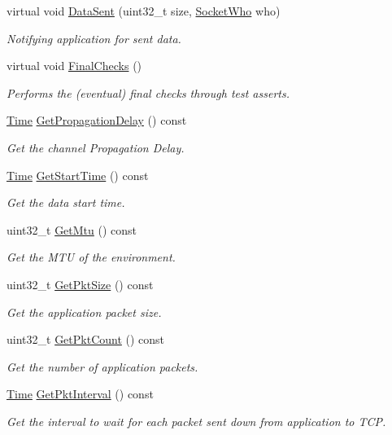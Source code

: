 \begin{DoxyCompactItemize}
virtual void \hyperlink{classns3_1_1TcpGeneralTest_a1de8ef221eeee5c045c91fe8fe8f3843}{Data\+Sent} (uint32\+\_\+t size, \hyperlink{classns3_1_1TcpGeneralTest_a29338e6b7137cad650c2ff835713f6ee}{Socket\+Who} who)
\begin{DoxyCompactList}\small\item\em Notifying application for sent data. \end{DoxyCompactList}\item 
virtual void \hyperlink{classns3_1_1TcpGeneralTest_ada871cedd37de404288f163b6f8dea39}{Final\+Checks} ()
\begin{DoxyCompactList}\small\item\em Performs the (eventual) final checks through test asserts. \end{DoxyCompactList}\item 
\hyperlink{classns3_1_1Time}{Time} \hyperlink{classns3_1_1TcpGeneralTest_a39a0256c9d4d4346a8676ac9b14173b7}{Get\+Propagation\+Delay} () const 
\begin{DoxyCompactList}\small\item\em Get the channel Propagation Delay. \end{DoxyCompactList}\item 
\hyperlink{classns3_1_1Time}{Time} \hyperlink{classns3_1_1TcpGeneralTest_a921a01ee88baaebb72540d0f214dd7ce}{Get\+Start\+Time} () const 
\begin{DoxyCompactList}\small\item\em Get the data start time. \end{DoxyCompactList}\item 
uint32\+\_\+t \hyperlink{classns3_1_1TcpGeneralTest_ae8a44e9247f9df0f21b99c4fab998561}{Get\+Mtu} () const 
\begin{DoxyCompactList}\small\item\em Get the M\+TU of the environment. \end{DoxyCompactList}\item 
uint32\+\_\+t \hyperlink{classns3_1_1TcpGeneralTest_a018172b33ae930bbfed1c6646c882e63}{Get\+Pkt\+Size} () const 
\begin{DoxyCompactList}\small\item\em Get the application packet size. \end{DoxyCompactList}\item 
uint32\+\_\+t \hyperlink{classns3_1_1TcpGeneralTest_acfbeb89fbb2453d16b6a4979b9ceac36}{Get\+Pkt\+Count} () const 
\begin{DoxyCompactList}\small\item\em Get the number of application packets. \end{DoxyCompactList}\item 
\hyperlink{classns3_1_1Time}{Time} \hyperlink{classns3_1_1TcpGeneralTest_a32770eaaf373ad26ad8c789ced7fef26}{Get\+Pkt\+Interval} () const 
\begin{DoxyCompactList}\small\item\em Get the interval to wait for each packet sent down from application to T\+CP. \end{DoxyCompactList}\end{DoxyCompactItemize}

